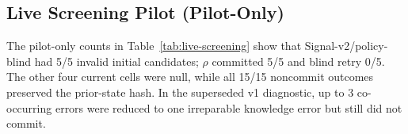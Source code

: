 \subsection{Live Screening Pilot (Pilot-Only)}
The pilot-only counts in Table~\ref{tab:live-screening} show that Signal-v2/policy-blind had 5/5 invalid initial candidates; $\rho$ committed 5/5 and blind retry 0/5. The other four current cells were null, while all 15/15 noncommit outcomes preserved the prior-state hash. In the superseded v1 diagnostic, up to 3 co-occurring errors were reduced to one irreparable knowledge error but still did not commit.
